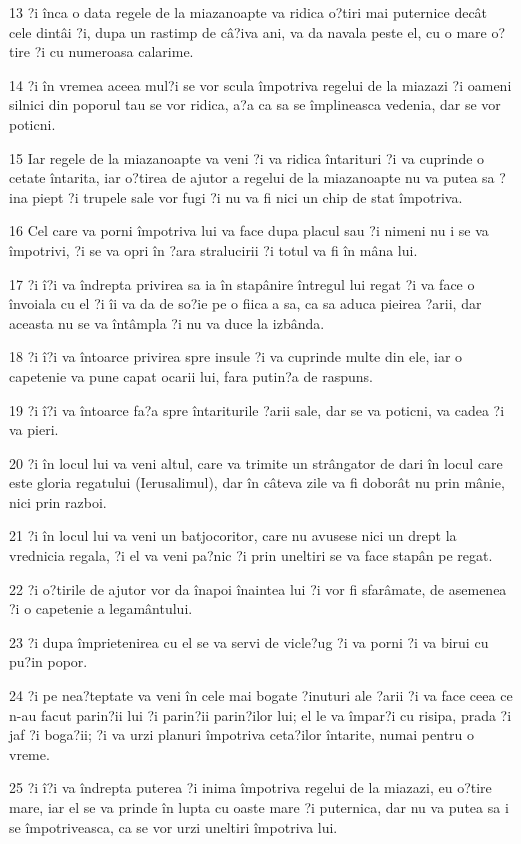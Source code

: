 \par 13 ?i înca o data regele de la miazanoapte va ridica o?tiri mai puternice decât cele dintâi ?i, dupa un rastimp de câ?iva ani, va da navala peste el, cu o mare o?tire ?i cu numeroasa calarime.
\par 14 ?i în vremea aceea mul?i se vor scula împotriva regelui de la miazazi ?i oameni silnici din poporul tau se vor ridica, a?a ca sa se împlineasca vedenia, dar se vor poticni.
\par 15 Iar regele de la miazanoapte va veni ?i va ridica întarituri ?i va cuprinde o cetate întarita, iar o?tirea de ajutor a regelui de la miazanoapte nu va putea sa ?ina piept ?i trupele sale vor fugi ?i nu va fi nici un chip de stat împotriva.
\par 16 Cel care va porni împotriva lui va face dupa placul sau ?i nimeni nu i se va împotrivi, ?i se va opri în ?ara stralucirii ?i totul va fi în mâna lui.
\par 17 ?i î?i va îndrepta privirea sa ia în stapânire întregul lui regat ?i va face o învoiala cu el ?i îi va da de so?ie pe o fiica a sa, ca sa aduca pieirea ?arii, dar aceasta nu se va întâmpla ?i nu va duce la izbânda.
\par 18 ?i î?i va întoarce privirea spre insule ?i va cuprinde multe din ele, iar o capetenie va pune capat ocarii lui, fara putin?a de raspuns.
\par 19 ?i î?i va întoarce fa?a spre întariturile ?arii sale, dar se va poticni, va cadea ?i va pieri.
\par 20 ?i în locul lui va veni altul, care va trimite un strângator de dari în locul care este gloria regatului (Ierusalimul), dar în câteva zile va fi doborât nu prin mânie, nici prin razboi.
\par 21 ?i în locul lui va veni un batjocoritor, care nu avusese nici un drept la vrednicia regala, ?i el va veni pa?nic ?i prin uneltiri se va face stapân pe regat.
\par 22 ?i o?tirile de ajutor vor da înapoi înaintea lui ?i vor fi sfarâmate, de asemenea ?i o capetenie a legamântului.
\par 23 ?i dupa împrietenirea cu el se va servi de vicle?ug ?i va porni ?i va birui cu pu?in popor.
\par 24 ?i pe nea?teptate va veni în cele mai bogate ?inuturi ale ?arii ?i va face ceea ce n-au facut parin?ii lui ?i parin?ii parin?ilor lui; el le va împar?i cu risipa, prada ?i jaf ?i boga?ii; ?i va urzi planuri împotriva ceta?ilor întarite, numai pentru o vreme.
\par 25 ?i î?i va îndrepta puterea ?i inima împotriva regelui de la miazazi, eu o?tire mare, iar el se va prinde în lupta cu oaste mare ?i puternica, dar nu va putea sa i se împotriveasca, ca se vor urzi uneltiri împotriva lui.
